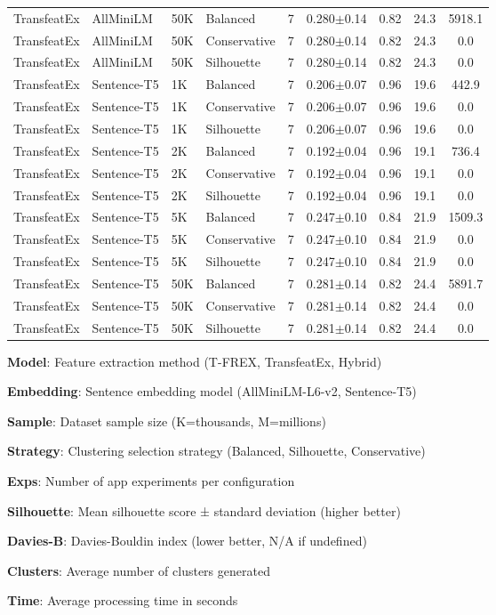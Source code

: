 \begin{table*}[htbp]
\begin{tabular}{|l|l|l|l|c|c|c|c|c|}
TransfeatEx & AllMiniLM & 50K & Balanced & 7 & 0.280$\pm$0.14 & 0.82 & 24.3 & 5918.1 \\
TransfeatEx & AllMiniLM & 50K & Conservative & 7 & 0.280$\pm$0.14 & 0.82 & 24.3 & 0.0 \\
TransfeatEx & AllMiniLM & 50K & Silhouette & 7 & 0.280$\pm$0.14 & 0.82 & 24.3 & 0.0 \\
\hline
TransfeatEx & Sentence-T5 & 1K & Balanced & 7 & 0.206$\pm$0.07 & 0.96 & 19.6 & 442.9 \\
TransfeatEx & Sentence-T5 & 1K & Conservative & 7 & 0.206$\pm$0.07 & 0.96 & 19.6 & 0.0 \\
TransfeatEx & Sentence-T5 & 1K & Silhouette & 7 & 0.206$\pm$0.07 & 0.96 & 19.6 & 0.0 \\
TransfeatEx & Sentence-T5 & 2K & Balanced & 7 & 0.192$\pm$0.04 & 0.96 & 19.1 & 736.4 \\
TransfeatEx & Sentence-T5 & 2K & Conservative & 7 & 0.192$\pm$0.04 & 0.96 & 19.1 & 0.0 \\
TransfeatEx & Sentence-T5 & 2K & Silhouette & 7 & 0.192$\pm$0.04 & 0.96 & 19.1 & 0.0 \\
TransfeatEx & Sentence-T5 & 5K & Balanced & 7 & 0.247$\pm$0.10 & 0.84 & 21.9 & 1509.3 \\
TransfeatEx & Sentence-T5 & 5K & Conservative & 7 & 0.247$\pm$0.10 & 0.84 & 21.9 & 0.0 \\
TransfeatEx & Sentence-T5 & 5K & Silhouette & 7 & 0.247$\pm$0.10 & 0.84 & 21.9 & 0.0 \\
TransfeatEx & Sentence-T5 & 50K & Balanced & 7 & 0.281$\pm$0.14 & 0.82 & 24.4 & 5891.7 \\
TransfeatEx & Sentence-T5 & 50K & Conservative & 7 & 0.281$\pm$0.14 & 0.82 & 24.4 & 0.0 \\
TransfeatEx & Sentence-T5 & 50K & Silhouette & 7 & 0.281$\pm$0.14 & 0.82 & 24.4 & 0.0 \\
\hline
\end{tabular}
\begin{tablenotes}
\footnotesize
\item \textbf{Model}: Feature extraction method (T-FREX, TransfeatEx, Hybrid)
\item \textbf{Embedding}: Sentence embedding model (AllMiniLM-L6-v2, Sentence-T5)
\item \textbf{Sample}: Dataset sample size (K=thousands, M=millions)
\item \textbf{Strategy}: Clustering selection strategy (Balanced, Silhouette, Conservative)
\item \textbf{Exps}: Number of app experiments per configuration
\item \textbf{Silhouette}: Mean silhouette score ± standard deviation (higher better)
\item \textbf{Davies-B}: Davies-Bouldin index (lower better, N/A if undefined)
\item \textbf{Clusters}: Average number of clusters generated
\item \textbf{Time}: Average processing time in seconds
\end{tablenotes}
\end{table*}

